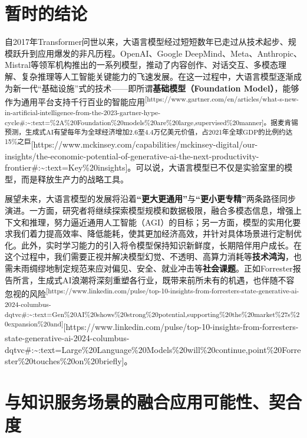 \documentclass[
  letterpaper,
]{scrbook}
\begin{document}
\section{暂时的结论}\label{ux6682ux65f6ux7684ux7ed3ux8bba}

自2017年Transformer问世以来，大语言模型经过短短数年已走过从技术起步、规模跃升到应用爆发的非凡历程。OpenAI、Google
DeepMind、Meta、Anthropic、Mistral等领军机构推出的一系列模型，推动了内容创作、对话交互、多模态理解、复杂推理等人工智能关键能力的飞速发展。在这一过程中，大语言模型逐渐成为新一代``基础设施''式的技术------即所谓\textbf{基础模型（Foundation
Model）}，能够作为通用平台支持千行百业的智能应用\textsuperscript{{[}https://www.gartner.com/en/articles/what-s-new-in-artificial-intelligence-from-the-2023-gartner-hype-cycle\#:\textasciitilde:text=\%2A\%20Foundation\%20models\%20are\%20large,supervised\%20manner{]}。据麦肯锡预测，生成式AI有望每年为全球经济增加2.6至4.4万亿美元价值，占2021年全球GDP的比例约达15\%之巨}{[}https://www.mckinsey.com/capabilities/mckinsey-digital/our-insights/the-economic-potential-of-generative-ai-the-next-productivity-frontier\#:\textasciitilde:text=Key\%20insights{]}。可以说，大语言模型已不仅是实验室里的模型，而是释放生产力的战略工具。

展望未来，大语言模型的发展将沿着\textbf{``更大更通用''}与\textbf{``更小更专精''}两条路径同步演进。一方面，研究者将继续探索模型规模和数据极限，融合多模态信息，增强上下文和推理，努力逼近通用人工智能（AGI）的目标；另一方面，模型的实用化要求我们着力提高效率、降低能耗，使其更加经济高效，并针对具体场景进行定制优化。此外，实时学习能力的引入将令模型保持知识新鲜度，长期陪伴用户成长。在这个过程中，我们需要正视并解决模型幻觉、不透明、高算力消耗等\textbf{技术鸿沟}，也需未雨绸缪地制定规范来应对偏见、安全、就业冲击等\textbf{社会课题}。正如Forrester报告所言，生成式AI浪潮将深刻重塑各行业，既带来前所未有的机遇，也伴随不容忽视的风险\textsuperscript{{[}https://www.linkedin.com/pulse/top-10-insights-from-forresters-state-generative-ai-2024-columbus-dqtvc\#:\textasciitilde:text=Gen\%20AI\%20shows\%20strong\%20potential,supporting\%20the\%20market\%27s\%20expansion\%20and{]}}{[}https://www.linkedin.com/pulse/top-10-insights-from-forresters-state-generative-ai-2024-columbus-dqtvc\#:\textasciitilde:text=Large\%20Language\%20Models\%20will\%20continue,point\%20Forrester\%20touches\%20on\%20briefly{]}。

\section{与知识服务场景的融合应用可能性、契合度}\label{ux4e0eux77e5ux8bc6ux670dux52a1ux573aux666fux7684ux878dux5408ux5e94ux7528ux53efux80fdux6027ux5951ux5408ux5ea6}
\end{document}
